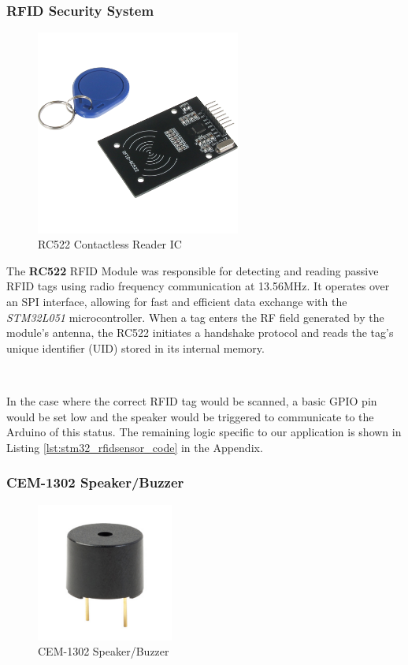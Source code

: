 \documentclass{article}
\begin{document}
\subsubsection{RFID Security System}
\label{sec:rfidsensor}
\begin{figure}[H]
    \centering
    \includegraphics[width=0.6\textwidth]{Figures/rfidsensor.png} %
    \caption{RC522 Contactless Reader IC}
    \label{fig:rfidsensor}


\end{figure}

The \textbf{RC522} RFID Module was responsible for detecting and reading passive RFID tags using radio frequency communication at 13.56MHz. It operates over an SPI interface, allowing for fast and efficient data exchange with the \emph{STM32L051} microcontroller. When a tag enters the RF field generated by the module’s antenna, the RC522 initiates a handshake protocol and reads the tag’s unique identifier (UID) stored in its internal memory.

\

In the case where the correct RFID tag would be scanned, a basic GPIO pin would be set low and the speaker would be triggered to communicate to the Arduino of this status. The remaining logic specific to our application is shown in Listing \ref{lst:stm32_rfidsensor_code} in the Appendix.

\subsubsection{CEM-1302 Speaker/Buzzer}
\label{sec:speaker}
\begin{figure}[H]
    \centering
    \includegraphics[width=0.4\textwidth]{Figures/speaker.png} %
    \caption{CEM-1302 Speaker/Buzzer}
    \label{fig:speaker}


\end{figure}
\end{document}
